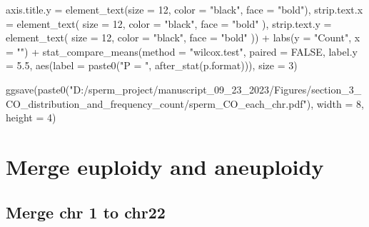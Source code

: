 \documentclass[
  letterpaper,
  DIV=11,
  numbers=noendperiod]{scrreprt}
\newenvironment{Shaded}{\begin{snugshade}}{\end{snugshade}}
\newcommand{\AttributeTok}[1]{\textcolor[rgb]{0.40,0.45,0.13}{#1}}
\newcommand{\ConstantTok}[1]{\textcolor[rgb]{0.56,0.35,0.01}{#1}}
\newcommand{\DecValTok}[1]{\textcolor[rgb]{0.68,0.00,0.00}{#1}}
\newcommand{\FloatTok}[1]{\textcolor[rgb]{0.68,0.00,0.00}{#1}}
\newcommand{\FunctionTok}[1]{\textcolor[rgb]{0.28,0.35,0.67}{#1}}
\newcommand{\NormalTok}[1]{\textcolor[rgb]{0.00,0.23,0.31}{#1}}
\newcommand{\SpecialCharTok}[1]{\textcolor[rgb]{0.37,0.37,0.37}{#1}}
\newcommand{\StringTok}[1]{\textcolor[rgb]{0.13,0.47,0.30}{#1}}
\begin{document}
\begin{codelisting}
\begin{Shaded}
\begin{Highlighting}[]
    \AttributeTok{axis.title.y =} \FunctionTok{element\_text}\NormalTok{(}\AttributeTok{size =} \DecValTok{12}\NormalTok{, }\AttributeTok{color =} \StringTok{"black"}\NormalTok{, }\AttributeTok{face =} \StringTok{"bold"}\NormalTok{),}
    \AttributeTok{strip.text.x =} \FunctionTok{element\_text}\NormalTok{(}
      \AttributeTok{size =} \DecValTok{12}\NormalTok{, }\AttributeTok{color =} \StringTok{"black"}\NormalTok{, }\AttributeTok{face =} \StringTok{"bold"}
\NormalTok{      ),}
    \AttributeTok{strip.text.y =} \FunctionTok{element\_text}\NormalTok{(}
      \AttributeTok{size =} \DecValTok{12}\NormalTok{, }\AttributeTok{color =} \StringTok{"black"}\NormalTok{, }\AttributeTok{face =} \StringTok{"bold"}
\NormalTok{      )) }\SpecialCharTok{+} 
  \FunctionTok{labs}\NormalTok{(}\AttributeTok{y =} \StringTok{"Count"}\NormalTok{, }\AttributeTok{x =} \StringTok{""}\NormalTok{) }\SpecialCharTok{+} \FunctionTok{stat\_compare\_means}\NormalTok{(}\AttributeTok{method =} \StringTok{"wilcox.test"}\NormalTok{, }\AttributeTok{paired =} \ConstantTok{FALSE}\NormalTok{, }\AttributeTok{label.y =} \FloatTok{5.5}\NormalTok{,}
                         \FunctionTok{aes}\NormalTok{(}\AttributeTok{label =} \FunctionTok{paste0}\NormalTok{(}\StringTok{"P = "}\NormalTok{, }\FunctionTok{after\_stat}\NormalTok{(p.format))), }\AttributeTok{size =} \DecValTok{3}\NormalTok{)}

\FunctionTok{ggsave}\NormalTok{(}\FunctionTok{paste0}\NormalTok{(}\StringTok{"D:/sperm\_project/manuscript\_09\_23\_2023/Figures/section\_3\_CO\_distribution\_and\_frequency\_count/sperm\_CO\_each\_chr.pdf"}\NormalTok{), }\AttributeTok{width =} \DecValTok{8}\NormalTok{, }\AttributeTok{height =} \DecValTok{4}\NormalTok{) }
\end{Highlighting}
\end{Shaded}

\end{codelisting}

\hypertarget{merge-euploidy-and-aneuploidy}{%
\section{Merge euploidy and
aneuploidy}\label{merge-euploidy-and-aneuploidy}}

\hypertarget{merge-chr-1-to-chr22}{%
\subsection{Merge chr 1 to chr22}\label{merge-chr-1-to-chr22}}
\end{document}
